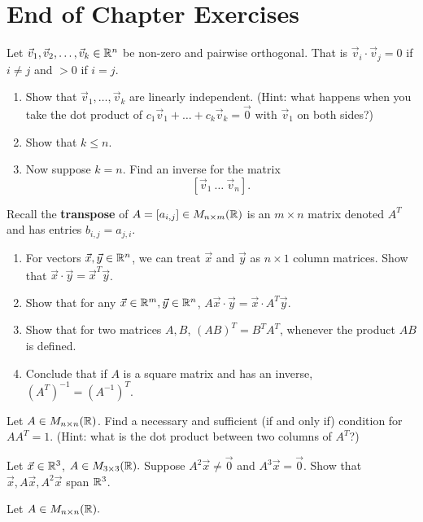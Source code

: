 \section{End of Chapter Exercises}
\begin{exerciselist}
	\item Let $\vec{v}_1,\vec{v}_2,\ldots,\vec{v}_k\in \mathbb{R}^n$ be non-zero and pairwise orthogonal. That is $\vec{v}_i\cdot\vec{v}_{j}=0$ if $i\neq j$ and $>0$ if $i=j$. \begin{enumerate} [label=(\alph*)]
		\item Show that $\vec{v}_1,\ldots,\vec{v}_k$ are linearly independent. (Hint: what happens when you take the dot product of $c_1\vec{v}_1+\ldots+c_k\vec{v}_k=\vec{0}$ with $\vec{v}_1$ on both sides?)
		\item Show that $k\leq n$.
		\item Now suppose $k=n$. Find an inverse for the matrix \[
		[\vec{v}_1 \ \ldots \ \vec{v}_n]. 
		\]
	\end{enumerate}
	\item Recall the \textbf{transpose} of $A=[a_{i,j}]\in M_{n\times m}(\mathbb{R})$ is an $m\times n$ matrix denoted $A^T$ and has entries $b_{i,j}=a_{j,i}$. \begin{enumerate}[label=(\alph*)]
		\item For vectors $\vec{x},\vec{y}\in\mathbb{R}^n$, we can treat $\vec{x}$ and $\vec{y}$ as $n\times 1$ column matrices. Show that $\vec{x}\cdot \vec{y} = \vec{x}^T\vec{y}$.
		\item Show that for any $\vec{x}\in \mathbb{R}^m, \vec{y}\in \mathbb{R}^n$, $A\vec{x}\cdot \vec{y}=\vec{x}\cdot A^T\vec{y}.$
		\item Show that for two matrices $A,B$,  $(AB)^T=B^T A^T$, whenever the product $AB$ is defined.
		\item Conclude that if $A$ is a square matrix and has an inverse, $(A^T)^{-1}=(A^{-1})^T.$
	\end{enumerate}
	\item Let $A\in M_{n\times n}(\mathbb{R})$. Find a necessary and sufficient (if and only if) condition for $AA^T=1$. (Hint: what is the dot product between two columns of $A^T$?) 
	\item Let $\vec{x}\in \mathbb{R}^3$, $A\in M_{3\times 3}(\mathbb{R}).$ Suppose $A^2\vec{x}\neq\vec{0}$ and $A^3\vec{x}=\vec{0}$. Show that $\vec{x}, A\vec{x},A^2\vec{x}$ span $\mathbb{R}^3$.
	\item Let $A\in M_{n\times n}(\mathbb{R}).$
	\begin{enumerate}[label=(\alph*)]

\end{enumerate}
\end{exerciselist}
